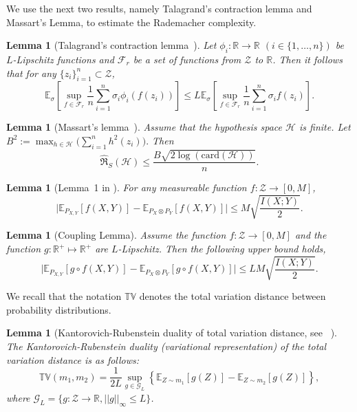 \documentclass{article}
\theoremstyle{plain}
\theoremstyle{plain}
\newtheorem{lemma}[theorem]{Lemma}
\theoremstyle{definition}
\theoremstyle{remark}
\newcommand{\mbE}{\mathbb{E}}
\begin{document}
We use the next two results, namely Talagrand's contraction lemma and Massart’s Lemma,   to estimate the Rademacher complexity.
\begin{lemma}[Talagrand's contraction lemma~\citep{shalev2014understanding}] \label{lem:contraction}
  Let $\phi_i : \mathbb{R} \rightarrow \mathbb{R}$ $(i\in \{1,\ldots,n\})$ be $L$-Lipschitz functions 
  and $\mathcal{F}_r$ be a set of functions from $\mathcal{Z}$ to $\mathbb{R}$. 
  Then it follows that for any $\{z_i\}_{i=1}^n \subset \mathcal{Z}$,
  \begin{equation*}
   \mbE_\sigma\left[ \sup_{f\in\mathcal{F}_r} \frac{1}{n}\sum_{i=1}^n\sigma_i \phi_i( f(z_i))\right]
    \leq L \mbE_\sigma\left[ \sup_{f \in \mathcal{F}_r} \frac{1}{n}\sum_{i=1}^n\sigma_i f(z_i)\right].
  \end{equation*}
\end{lemma}
\begin{lemma}[Massart’s lemma~\citep{massart2000some}]\label{lem: massart}
Assume that the hypothesis space $\mathcal{H}$ is finite. Let $B^2:=\max_{h\in\mathcal{H}}\Big(\sum_{i=1}^n h^2(z_i)\Big).$
 Then 
\[\hat{\mathfrak{R}}_{S}(\mathcal{H})\leq   \frac{B\sqrt{2\log(\mathrm{card}(\mathcal{H}))}}{n}.\]
    
\end{lemma}

\begin{lemma}[Lemma~1 in \citep{xu2017information}] \label{lem: ragins} For any measureable  function $f: \mathcal{Z} \rightarrow [0,M]$,
\[\Big| \mbE_{P_{X,Y}}[f(X,Y)]-\mbE_{P_X \otimes P_Y}[f(X,Y)]\Big|\leq M\sqrt{\frac{I(X;Y)}{2}}.\]
\end{lemma}

\begin{lemma}[Coupling Lemma]\label{lem: coupling}
Assume the function  $f: \mathcal{Z} \rightarrow [0,M]$ and the function $g:\mathbb R^+\mapsto \mathbb R^+$ are $L$-Lipschitz. Then the following upper bound holds,
\[\Big| \mbE_{P_{X,Y}}[g\circ f(X,Y)]-\mbE_{P_X \otimes P_Y}[g\circ f(X,Y)]\Big|\leq L M\sqrt{\frac{I(X;Y)}{2}}.\]
\end{lemma}
We recall that the notation $\mathbb{TV}$ denotes the total variation distance between probability distributions.
\begin{lemma}[Kantorovich-Rubenstein duality of total variation distance, see ~\citep{polyanskiy2022information}]\label{lem: tv} The Kantorovich-Rubenstein duality (variational representation) of the total variation distance is as follows:
\begin{equation}\label{Eq: tv rep}
    \mathbb{TV}(m_1,m_2)=\frac{1}{2L}\sup_{g \in \mathcal{G}_L}\left\{\mathbb{E}_{Z\sim m_1}[g(Z)]-\mathbb{E}_{Z\sim m_2}[g(Z)]\right\},
\end{equation}
where $\mathcal{G}_L=\{g: \mathcal{Z}\rightarrow \mathbb{R}, ||g||_\infty \leq L \}$. 
\end{lemma}
\end{document}
